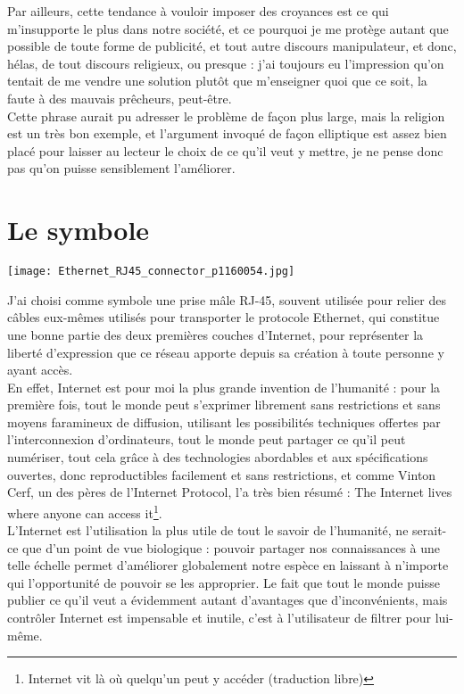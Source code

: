 \documentclass[12pt,a4paper]{article}
\begin{document}
{Par ailleurs, cette tendance à vouloir imposer des croyances est ce qui m'insupporte le plus dans notre société, et ce pourquoi je me protège autant que possible de toute forme de publicité, et tout autre discours manipulateur, et donc, hélas, de tout discours religieux, ou presque : j'ai toujours eu l'impression qu'on tentait de me vendre une solution plutôt que m'enseigner quoi que ce soit, la faute à des mauvais prêcheurs, peut-être.\\

Cette phrase aurait pu adresser le problème de façon plus large, mais la religion est un très bon exemple, et l'argument invoqué de façon elliptique est assez bien placé pour laisser au lecteur le choix de ce qu'il veut y mettre, je ne pense donc pas qu'on puisse sensiblement l'améliorer.\\

\part{Le symbole}

\texttt{[image: Ethernet\_RJ45\_connector\_p1160054.jpg]}

J'ai choisi comme symbole une prise mâle RJ-45, souvent utilisée pour relier des câbles eux-mêmes utilisés pour transporter le protocole Ethernet, qui constitue une bonne partie des deux premières couches d'Internet, pour représenter la liberté d'expression que ce réseau apporte depuis sa création à toute personne y ayant accès.\\

En effet, Internet est pour moi la plus grande invention de l'humanité : pour la première fois, tout le monde peut s'exprimer librement sans restrictions et sans moyens faramineux de diffusion, utilisant les possibilités techniques offertes par l'interconnexion d'ordinateurs, tout le monde peut partager ce qu'il peut numériser, tout cela grâce à des technologies abordables et aux spécifications ouvertes, donc reproductibles facilement et sans restrictions, et comme Vinton Cerf, un des pères de l'Internet Protocol,  l'a très bien résumé : \og{}The Internet lives where anyone can access it\footnote{Internet vit là où quelqu'un peut y accéder (traduction libre)}\fg{}.\\

L'Internet est l'utilisation la plus utile de tout le savoir de l'humanité, ne serait-ce que d'un point de vue biologique : pouvoir partager nos connaissances à une telle échelle permet d'améliorer globalement notre espèce en laissant à n'importe qui l'opportunité de pouvoir se les approprier. Le fait que tout le monde puisse publier ce qu'il veut a évidemment autant d'avantages que d'inconvénients, mais contrôler Internet est impensable et inutile, c'est à l'utilisateur de filtrer pour lui-même.\\

}
\end{document}
